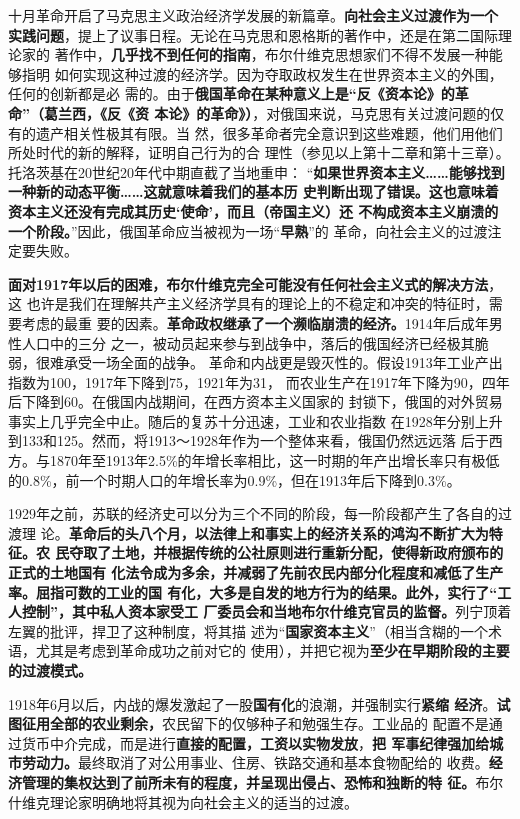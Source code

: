 十月革命开启了马克思主义政治经济学发展的新篇章。\textbf{向社会主义过渡作为一个
实践问题}，提上了议事日程。无论在马克思和恩格斯的著作中，还是在第二国际理论家的
著作中，\textbf{几乎找不到任何的指南}，布尔什维克思想家们不得不发展一种能够指明
如何实现这种过渡的经济学。因为夺取政权发生在世界资本主义的外围，任何的创新都是必
需的。由于\textbf{俄国革命在某种意义上是“反《资本论》的革命”（葛兰西，《反《资
本论》的革命》）}，对俄国来说，马克思有关过渡问题的仅有的遗产相关性极其有限。当
然，很多革命者完全意识到这些难题，他们用他们所处时代的新的解释，证明自己行为的合
理性（参见以上第十二章和第十三章）。托洛茨基在20世纪20年代中期直截了当地重申：
“\textbf{如果世界资本主义……能够找到一种新的动态平衡……这就意味着我们的基本历
史判断出现了错误。这也意味着资本主义还没有完成其历史‘使命’，而且（帝国主义）还
不构成资本主义崩溃的一个阶段。}”因此，俄国革命应当被视为一场“\textbf{早熟}”的
革命，向社会主义的过渡注定要失败。

\textbf{面对1917年以后的困难，布尔什维克完全可能没有任何社会主义式的解决方法}，这
也许是我们在理解共产主义经济学具有的理论上的不稳定和冲突的特征时，需要考虑的最重
要的因素。\textbf{革命政权继承了一个濒临崩溃的经济。}1914年后成年男性人口中的三分
之一，被动员起来参与到战争中，落后的俄国经济已经极其脆弱，很难承受一场全面的战争。
革命和内战更是毁灭性的。假设1913年工业产出指数为100，1917年下降到75，1921年为31，
而农业生产在1917年下降为90，四年后下降到60。在俄国内战期间，在西方资本主义国家的
封锁下，俄国的对外贸易事实上几乎完全中止。随后的复苏十分迅速，工业和农业指数
在1928年分别上升到133和125。然而，将1913～1928年作为一个整体来看，俄国仍然远远落
后于西方。与1870年至1913年2.5\%的年增长率相比，这一时期的年产出增长率只有极低
的0.8\%，前一个时期人口的年增长率为0.9\%，但在1913年后下降到0.3\%。

1929年之前，苏联的经济史可以分为三个不同的阶段，每一阶段都产生了各自的过渡理
论。\textbf{革命后的头八个月，以法律上和事实上的经济关系的鸿沟不断扩大为特征。农
  民夺取了土地，并根据传统的公社原则进行重新分配，使得新政府颁布的正式的土地国有
  化法令成为多余，并减弱了先前农民内部分化程度和减低了生产率。屈指可数的工业的国
  有化，大多是自发的地方行为的结果。此外，实行了“工人控制”，其中私人资本家受工
  厂委员会和当地布尔什维克官员的监督。}列宁顶着左翼的批评，捍卫了这种制度，将其描
述为“\textbf{国家资本主义}”（相当含糊的一个术语，尤其是考虑到革命成功之前对它的
使用），并把它视为\textbf{至少在早期阶段的主要的过渡模式。}

1918年6月以后，内战的爆发激起了一股\textbf{国有化}的浪潮，并强制实行\textbf{紧缩
  经济}。\textbf{试图征用全部的农业剩余，}农民留下的仅够种子和勉强生存。工业品的
配置不是通过货币中介完成，而是进行\textbf{直接的配置，工资以实物发放}，\textbf{把
  军事纪律强加给城市劳动力。}最终取消了对公用事业、住房、铁路交通和基本食物配给的
收费。\textbf{经济管理的集权达到了前所未有的程度，并呈现出侵占、恐怖和独断的特
  征。}布尔什维克理论家明确地将其视为向社会主义的适当的过渡。

